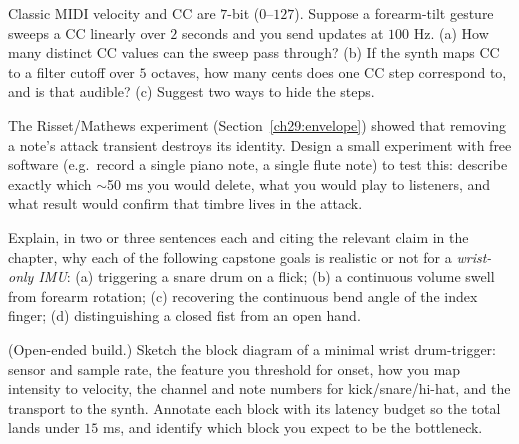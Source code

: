 \begin{exercise}
Classic MIDI velocity and CC are $7$-bit ($0$--$127$). Suppose a forearm-tilt gesture sweeps a CC
linearly over $2$ seconds and you send updates at $100$ Hz. (a) How many distinct CC values can the
sweep pass through? (b) If the synth maps CC to a filter cutoff over $5$ octaves, how many cents does
one CC step correspond to, and is that audible? (c) Suggest two ways to hide the steps.
\end{exercise}

\begin{exercise}
The Risset/Mathews experiment (Section~\ref{ch29:envelope}) showed that removing a note's attack
transient destroys its identity. Design a small experiment with free software (e.g.\ record a single
piano note, a single flute note) to test this: describe exactly which $\sim$50 ms you would delete,
what you would play to listeners, and what result would confirm that timbre lives in the attack.
\end{exercise}

\begin{exercise}
Explain, in two or three sentences each and citing the relevant claim in the chapter, why each of the
following capstone goals is realistic or not for a \emph{wrist-only IMU}: (a) triggering a snare drum
on a flick; (b) a continuous volume swell from forearm rotation; (c) recovering the continuous bend
angle of the index finger; (d) distinguishing a closed fist from an open hand.
\end{exercise}

\begin{exercise}
(Open-ended build.) Sketch the block diagram of a minimal wrist drum-trigger: sensor and sample rate,
the feature you threshold for onset, how you map intensity to velocity, the channel and note numbers
for kick/snare/hi-hat, and the transport to the synth. Annotate each block with its latency budget so
the total lands under $15$ ms, and identify which block you expect to be the bottleneck.
\end{exercise}
